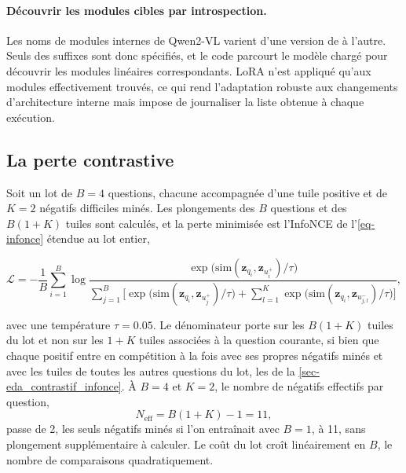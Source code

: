 \paragraph{Découvrir les modules cibles par introspection.} Les noms de modules
internes de Qwen2-VL varient d'une version de  à l'autre.
Seuls des suffixes sont donc spécifiés, et le code parcourt le modèle chargé pour
découvrir les modules linéaires correspondants. LoRA n'est appliqué qu'aux
modules effectivement trouvés, ce qui rend l'adaptation robuste aux changements
d'architecture interne mais impose de journaliser la liste obtenue à chaque
exécution.
 
\subsection{La perte contrastive}
\label{sec-contrastif_loss}
 
Soit un lot de $B = 4$ questions, chacune accompagnée d'une tuile positive et de
$K = 2$ négatifs difficiles minés. Les plongements des $B$ questions et des
$B(1+K)$ tuiles sont calculés, et la perte minimisée est l'InfoNCE de
l'\cref{eq-infonce} étendue au lot entier,
 
\begin{equation}
\mathcal{L} = -\frac{1}{B}\sum_{i=1}^{B} \log
\frac{\exp\!\big(\mathrm{sim}(\mathbf{z}_{q_i}, \mathbf{z}_{u_i^{+}})/\tau\big)}
     {\displaystyle\sum_{j=1}^{B}\Big[
       \exp\!\big(\mathrm{sim}(\mathbf{z}_{q_i}, \mathbf{z}_{u_j^{+}})/\tau\big)
       + \sum_{l=1}^{K}
       \exp\!\big(\mathrm{sim}(\mathbf{z}_{q_i}, \mathbf{z}_{u_{j,l}^{-}})/\tau\big)
     \Big]},
\label{eq-infonce_lot}
\end{equation}
 
avec une température $\tau = \num{0.05}$. Le dénominateur porte sur les $B(1+K)$
tuiles du lot et non sur les $1+K$ tuiles associées à la question courante, si
bien que chaque positif entre en compétition à la fois avec ses propres négatifs
minés et avec les tuiles de toutes les autres questions du lot, les
 de la \cref{sec-eda_contrastif_infonce}. À $B = 4$
et $K = 2$, le nombre de négatifs effectifs par question,
\begin{equation}
N_{\text{eff}} = B(1+K) - 1 = 11,
\label{eq-negatifs_effectifs}
\end{equation}
passe de \num{2}, les seuls négatifs minés si l'on entraînait avec $B = 1$, à
\num{11}, sans plongement supplémentaire à calculer. Le coût du lot croît
linéairement en $B$, le nombre de comparaisons quadratiquement.
 
